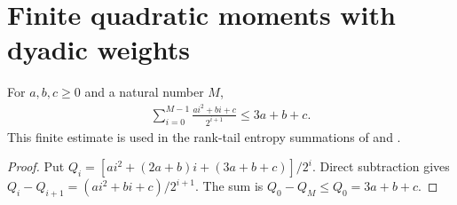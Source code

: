 \section{Finite quadratic moments with dyadic weights}

\begin{theorem}
    \label{thm:quadratic_dyadic_moments}
    \leanok
    For $a,b,c\ge0$ and a natural number $M$,
    \begin{align*}
        \sum_{i=0}^{M-1}\frac{ai^2+bi+c}{2^{i+1}}\le3a+b+c.
    \end{align*}
    This finite estimate is used in the rank-tail entropy summations of
    \cite{Arad2013AreaLaw} and \cite{Arad2016RigorousRG}.
\end{theorem}
\begin{proof}
    \leanok
    Put $Q_i=[ai^2+(2a+b)i+(3a+b+c)]/2^i$.
    Direct subtraction gives
    $Q_i-Q_{i+1}=(ai^2+bi+c)/2^{i+1}$.
    The sum is $Q_0-Q_M\le Q_0=3a+b+c$.
\end{proof}
